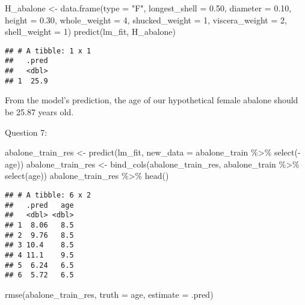 \documentclass[
]{article}
\newenvironment{Shaded}{\begin{snugshade}}{\end{snugshade}}
\newcommand{\AttributeTok}[1]{\textcolor[rgb]{0.77,0.63,0.00}{#1}}
\newcommand{\DecValTok}[1]{\textcolor[rgb]{0.00,0.00,0.81}{#1}}
\newcommand{\FloatTok}[1]{\textcolor[rgb]{0.00,0.00,0.81}{#1}}
\newcommand{\FunctionTok}[1]{\textcolor[rgb]{0.00,0.00,0.00}{#1}}
\newcommand{\NormalTok}[1]{#1}
\newcommand{\OtherTok}[1]{\textcolor[rgb]{0.56,0.35,0.01}{#1}}
\newcommand{\SpecialCharTok}[1]{\textcolor[rgb]{0.00,0.00,0.00}{#1}}
\newcommand{\StringTok}[1]{\textcolor[rgb]{0.31,0.60,0.02}{#1}}
\begin{document}
\begin{Shaded}
\begin{Highlighting}[]
\NormalTok{H\_abalone }\OtherTok{\textless{}{-}} \FunctionTok{data.frame}\NormalTok{(}\AttributeTok{type =} \StringTok{"F"}\NormalTok{, }\AttributeTok{longest\_shell =} \FloatTok{0.50}\NormalTok{, }\AttributeTok{diameter =} \FloatTok{0.10}\NormalTok{, }\AttributeTok{height =} \FloatTok{0.30}\NormalTok{, }\AttributeTok{whole\_weight =} \DecValTok{4}\NormalTok{, }\AttributeTok{shucked\_weight =} \DecValTok{1}\NormalTok{, }\AttributeTok{viscera\_weight =} \DecValTok{2}\NormalTok{, }\AttributeTok{shell\_weight =} \DecValTok{1}\NormalTok{)}
\FunctionTok{predict}\NormalTok{(lm\_fit, H\_abalone)}
\end{Highlighting}
\end{Shaded}

\begin{verbatim}
## # A tibble: 1 x 1
##   .pred
##   <dbl>
## 1  25.9
\end{verbatim}

\n

From the model's prediction, the age of our hypothetical female abalone
should be 25.87 years old. \n

Question 7:

\begin{Shaded}
\begin{Highlighting}[]
\NormalTok{abalone\_train\_res }\OtherTok{\textless{}{-}} \FunctionTok{predict}\NormalTok{(lm\_fit, }\AttributeTok{new\_data =}\NormalTok{ abalone\_train }\SpecialCharTok{\%\textgreater{}\%} \FunctionTok{select}\NormalTok{(}\SpecialCharTok{{-}}\NormalTok{age))}
\NormalTok{abalone\_train\_res }\OtherTok{\textless{}{-}} \FunctionTok{bind\_cols}\NormalTok{(abalone\_train\_res, abalone\_train }\SpecialCharTok{\%\textgreater{}\%} \FunctionTok{select}\NormalTok{(age))}
\NormalTok{abalone\_train\_res }\SpecialCharTok{\%\textgreater{}\%}
  \FunctionTok{head}\NormalTok{()}
\end{Highlighting}
\end{Shaded}

\begin{verbatim}
## # A tibble: 6 x 2
##   .pred   age
##   <dbl> <dbl>
## 1  8.06   8.5
## 2  9.76   8.5
## 3 10.4    8.5
## 4 11.1    9.5
## 5  6.24   6.5
## 6  5.72   6.5
\end{verbatim}

\begin{Shaded}
\begin{Highlighting}[]
\FunctionTok{rmse}\NormalTok{(abalone\_train\_res, }\AttributeTok{truth =}\NormalTok{ age, }\AttributeTok{estimate =}\NormalTok{ .pred)}
\end{Highlighting}
\end{Shaded}
\end{document}
